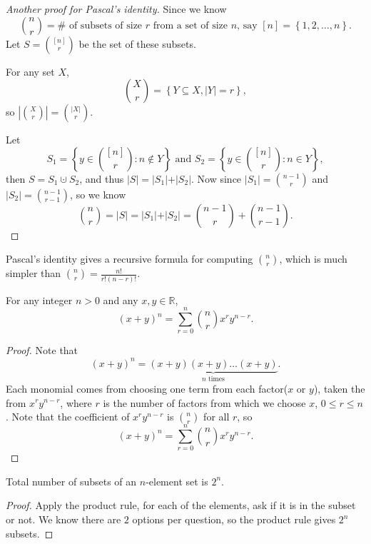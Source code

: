 \begin{proof}[Another proof for Pascal's identity]
    Since we know 
    \[
        \binom{n}{r} = \# \text{ of subsets of size } r \text{ from a set of size } n \text{, say } [n] = \left\{ 1,2, \dots , n \right\}.    
    \]
    Let \(S = \binom{[n]}{r}\) be the set of these subsets. 
    \begin{notation}
        For any set \(X\), 
        \[
            \binom{X}{r} = \left\{ Y \subseteq X, \vert Y \vert = r \right\},  
        \] 
        so \(\left\vert \binom{X}{r} \right\vert = \binom{\vert X \vert }{r} \). 
    \end{notation} 

    Let
    \[
        S_1 = \left\{ y \in \binom{[n]}{r}: n \notin Y \right\} \text{ and } S_2 = \left\{ y \in \binom{[n]}{r} : n \in Y \right\},   
    \]
    then \(S = S_1 \cupdot S_2\), and thus \(\vert S \vert = \vert S_1 \vert + \vert S_2 \vert   \). Now since \(\vert S_1 \vert = \binom{n - 1}{r} \) and \(\vert S_2 \vert = \binom{n - 1}{r - 1} \), so we know 
    \[
        \binom{n}{r} = \vert S \vert = \vert S_1 \vert + \vert S_2 \vert = \binom{n - 1}{r} + \binom{n - 1}{r - 1}.
    \]    
\end{proof}

\begin{remark}
    Pascal's identity gives a recursive formula for computing \(\binom{n}{r}\), which is much simpler than \(\binom{n}{r} = \frac{n!}{r! (n-r)!}\).  
\end{remark}

\begin{theorem}
    For any integer \(n > 0\) and any \(x, y \in \mathbb{R} \), 
    \[
        (x + y)^n = \sum_{r=0}^n \binom{n}{r} x^r y^{n-r}. 
    \]  
\end{theorem}
\begin{proof}
    Note that 
    \[
        (x+y)^n = \underbrace{(x+y)(x+y)\dots (x+y)}_{n \text{ times}}.
    \]
    Each monomial comes from choosing one term from each factor(\(x\) or \(y\)), taken the from \(x^r y^{n-r}\), where \(r\) is the number of factors from which we choose \(x\), \(0 \le r \le n\). Note that the coefficient of \(x^r y^{n-r}\) is \(\binom{n}{r}\) for all \(r\), so 
    \[
        (x+y)^n = \sum_{r=0}^n \binom{n}{r} x^r y^{n-r}.
    \]       
\end{proof}

\begin{corollary}
    Total number of subsets of an \(n\)-element set is \(2^n\).  
\end{corollary}
\begin{proof}
    Apply the product rule, for each of the elements, ask if it is in the subset or not. We know there are \(2\) options per question, so the product rule gives \(2^n\) subsets.  
\end{proof}

